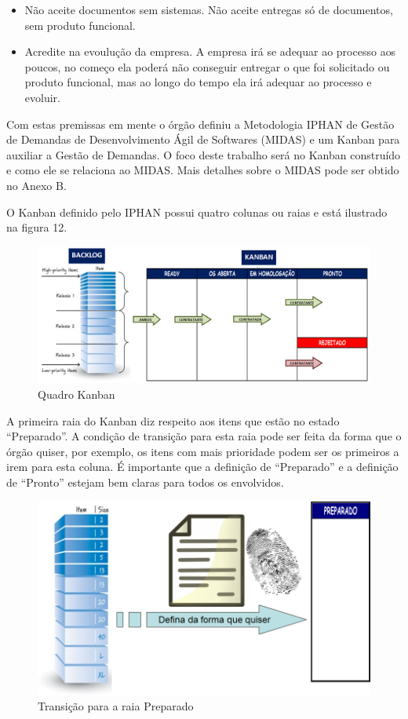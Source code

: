 \begin{itemize}
\item Não aceite documentos sem sistemas. Não aceite entregas só de documentos, sem produto funcional.
\item Acredite na evoulução da empresa. A empresa irá se adequar ao processo aos poucos, no começo ela poderá não conseguir entregar o que foi solicitado ou produto funcional, mas ao longo do tempo ela irá adequar ao processo e evoluir. 
\end{itemize} 

Com estas premissas em mente o órgão definiu a Metodologia IPHAN de Gestão de Demandas de Desenvolvimento Ágil de Softwares (MIDAS) e um Kanban para auxiliar a Gestão de Demandas. O foco deste trabalho será no Kanban construído e como ele se relaciona ao MIDAS. Mais detalhes sobre o MIDAS pode ser obtido no Anexo B. 

O Kanban definido pelo IPHAN possui quatro colunas ou raias e está ilustrado na figura 12.

\begin{figure}[H]
		\centering
		\label{fig05}
			\includegraphics[scale=0.5]{figuras/kanbanIPHAN1.png}
		\caption{Quadro Kanban  \cite{parente}}
\end{figure}

A primeira raia do Kanban diz respeito aos itens que estão no estado “Preparado”. A condição de transição para esta raia pode ser feita da forma que o órgão quiser, por exemplo, os itens com mais prioridade podem ser os primeiros a irem para esta coluna. É importante que a definição de “Preparado” e a definição de “Pronto” estejam bem claras para todos os envolvidos.  

\begin{figure}[H]
		\centering
		\label{fig06}
			\includegraphics[scale=0.5]{figuras/kanbanIPHAN2.png}
		\caption{Transição para a raia Preparado \cite{parente}}
\end{figure}

